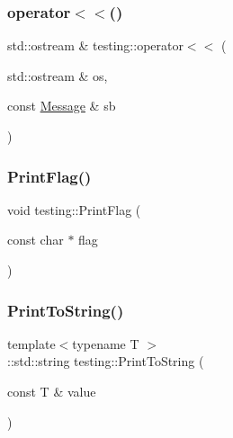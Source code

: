 \mbox{\label{namespacetesting_a2d038049296f23fb404311f974788cd3}} 
\subsubsection{\texorpdfstring{operator$<$$<$()}{operator<<()}\hspace{0.1cm}{\footnotesize\ttfamily [2/2]}}
{\footnotesize\ttfamily std\+::ostream \& testing\+::operator$<$$<$ (\begin{DoxyParamCaption}\item[{std\+::ostream \&}]{os,  }\item[{const \mbox{\hyperlink{classtesting_1_1_message}{Message}} \&}]{sb }\end{DoxyParamCaption})\hspace{0.3cm}{\ttfamily [inline]}}

\mbox{\label{namespacetesting_a9863402455bfcf9be5fc0b1453a6d97d}} 
\subsubsection{\texorpdfstring{PrintFlag()}{PrintFlag()}}
{\footnotesize\ttfamily void testing\+::\+Print\+Flag (\begin{DoxyParamCaption}\item[{const char $\ast$}]{flag }\end{DoxyParamCaption})}

\mbox{\label{namespacetesting_aa5717bb1144edd1d262d310ba70c82ed}} 
\subsubsection{\texorpdfstring{PrintToString()}{PrintToString()}}
{\footnotesize\ttfamily template$<$typename T $>$ \\
\+::std\+::string testing\+::\+Print\+To\+String (\begin{DoxyParamCaption}\item[{const T \&}]{value }\end{DoxyParamCaption})}

